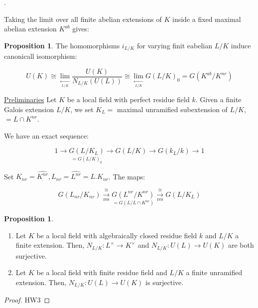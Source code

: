 \documentclass{article}
\theoremstyle{definition}
\numberwithin{theorem}{subsection}
\newtheorem{proposition}[theorem]{Proposition}
\begin{document}
\begin{enumerate}[label=\arabic*)]
        [Use \(N_{L^{\prime} / K}(U_{L^{\prime}}) = N_{L / K}(N_{L^{\prime} / L}(U(L^{\prime}))) \subset N_{L / K} (U(L)) \)].

        Taking the limit over all finite abelian extensions of \(K\) inside a fixed maximal abelian extension \(K^{ab}\) gives:

        \begin{proposition}
            The homomorphisms \(i_{L / K}\) for varying finit eabelian \(L / K\) induce canonicall isomorphism:

            \[
                U(K) \cong \lim_{\xleftarrow[L / K]{}} \frac{U(K)}{N_{L / K}(U(L))} \cong \lim_{\xleftarrow[L / K]{}} G(L / K)_0 = G(K^{ab} / K^{nr}) 
            \]
        \end{proposition}

    \end{enumerate} 

    \underline{Preliminaries} Let \(K\) be a local field with perfect residue field \(k\). Given a finite Galois extension \(L / K\), we set \(K_L = \) maximal unramified subextension of \(L / K\), \(=L \cap K^{nr}\).

    We have an exact sequence:

    \[
        1 \to \underset{=G(L / K)_0}{G(L / K_L)} \to G(L / K) \to G(k_L / k) \to 1 
    \]

    Set \(K_{nr} = \widehat{K^{nr}}, L_{nr} = \widehat{L^{nr}} = L . K_{nr}\). The maps:
    
    \[
        G(L_{nr} / K_{nr}) \xrightarrow[\text{res}]{\cong} \underset{=G(L / L\cap K^{nr})}{G(L^{nr} / K^{nr})} \xrightarrow[\text{res}]{\cong} G(L / K_L)
    \]

    \begin{proposition}
        \begin{enumerate}[label=\roman*)]
            \item Let \(K\) be a local field with algebraically closed residue field \(k\) and \(L / K\) a finite extension. Then, \(N_{L / K}: L^\times \to K^\times\) and \(N_{L / K}: U(L) \to U(K)\) are both surjective.
            \item Let \(K\) be a local field with finite residue field and \(L / K\) a finite unramified extension. Then, \(N_{L / K}: U(L) \to U(K)\) is surjective. 
        \end{enumerate} 

        \begin{proof}
            HW3
        \end{proof}
    \end{proposition}
\end{document}
